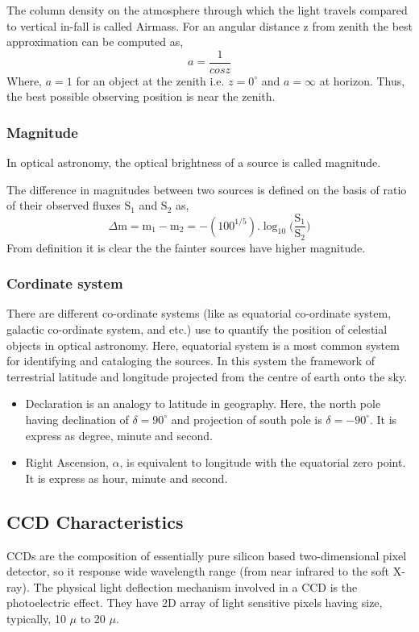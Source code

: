 The column density on the atmosphere through which the light travels compared to vertical in-fall is called Airmass. For an angular distance z from zenith the best approximation can be computed as,
\begin{equation}
a=\frac{1}{cos z}
\end{equation}
Where, $ a=1 $ for an object at the zenith i.e. $ z= 0^{\circ} $ and $ a=\infty $ at horizon.
Thus, the best possible observing position is near the zenith.\\

\subsubsection{Magnitude}
In optical astronomy, the optical brightness of a source is called magnitude.

The difference in magnitudes between two sources is defined on the basis of ratio of their observed fluxes $ \text{S}_{1} $ and $ \text{S}_{2} $ as,
\begin{equation}
\Delta \text{m}= \text{m}_{1}-\text{m}_{2}=-(100^{1/5}). \log_{10} \bigg(\frac{\text{S}_{1}}{\text{S}_{2}}\bigg)
\end{equation}
From definition it is clear the the fainter sources have higher magnitude.\\

\subsubsection{Cordinate system}
There are different co-ordinate systems (like as equatorial co-ordinate system, galactic co-ordinate system, and etc.) use to quantify the position of celestial objects in optical astronomy. Here, equatorial system is a most common system for identifying and cataloging the sources. In this system the framework of terrestrial latitude and longitude projected from the centre of earth onto the sky.
\begin{itemize}
	\item Declaration is an analogy to latitude in geography. Here, the north pole having declination of $ \delta=90^{\circ} $ and projection of south pole is  $ \delta= -90^{\circ} $. It is express as degree, minute and second. 
	\item Right Ascension, $\alpha $, is equivalent to longitude with the equatorial zero point. It is express as hour, minute and second.
\end{itemize}

\subsection{CCD Characteristics}
CCDs are the composition of essentially pure silicon based two-dimensional pixel detector, so it response wide wavelength range (from near infrared to the soft X-ray). The physical  light deflection mechanism involved in a CCD is the photoelectric effect. They have 2D array of light sensitive pixels having size, typically,  10 $ \mu $ to 20 $ \mu $. \\ 

